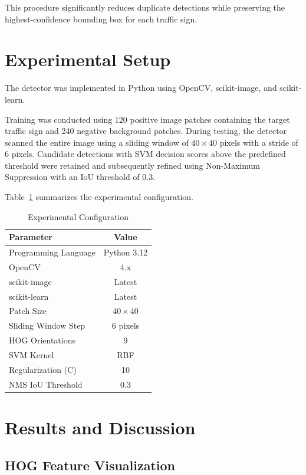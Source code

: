 \documentclass[11pt,a4paper,twoside]{article}
\begin{document}
This procedure significantly reduces duplicate detections while preserving the highest-confidence bounding box for each traffic sign.



\section{Experimental Setup}

The detector was implemented in Python using OpenCV, scikit-image, and scikit-learn.

Training was conducted using 120 positive image patches containing the target traffic sign and 240 negative background patches. During testing, the detector scanned the entire image using a sliding window of $40\times40$ pixels with a stride of 6 pixels. Candidate detections with SVM decision scores above the predefined threshold were retained and subsequently refined using Non-Maximum Suppression with an IoU threshold of 0.3.

Table~\ref{tab:experiment} summarizes the experimental configuration.
\begin{table}[ht]
\centering
\caption{Experimental Configuration}
\label{tab:experiment}
\begin{tabular}{lc}
\hline
Parameter & Value\\
\hline
Programming Language & Python 3.12\\
OpenCV & 4.x\\
scikit-image & Latest\\
scikit-learn & Latest\\
Patch Size & $40\times40$\\
Sliding Window Step & 6 pixels\\
HOG Orientations & 9\\
SVM Kernel & RBF\\
Regularization (C) & 10\\
NMS IoU Threshold & 0.3\\
\hline
\end{tabular}
\end{table}

\section{Results and Discussion}

\subsection{HOG Feature Visualization}
\end{document}
